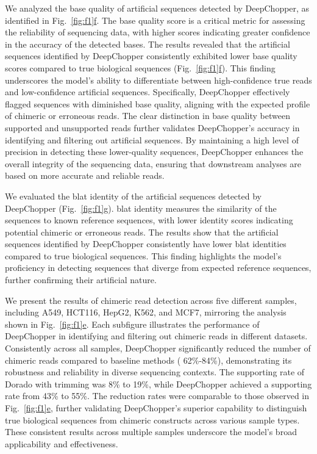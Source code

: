 \documentclass[pdflatex, sn-mathphys-num, lineno]{sn-jnl}%
\newcommand{\figref}[2]{Fig.~\hyperref[#1]{\ref*{#1}#2}}
\theoremstyle{thmstyleone}%
\theoremstyle{thmstyletwo}%
\theoremstyle{thmstylethree}%
\begin{document}
We analyzed the base quality of artificial sequences detected by DeepChopper, as identified in \figref{fig:f1}{f}.
The base quality score is a critical metric for assessing the reliability of sequencing data, with higher scores indicating greater confidence in the accuracy of the detected bases.
The results revealed that the artificial sequences identified by DeepChopper consistently exhibited lower base quality scores compared to true biological sequences (\figref{fig:f1}{f}).
This finding underscores the model's ability to differentiate between high-confidence true reads and low-confidence artificial sequences.
Specifically, DeepChopper effectively flagged sequences with diminished base quality, aligning with the expected profile of chimeric or erroneous reads.
The clear distinction in base quality between supported and unsupported reads further validates DeepChopper's accuracy in identifying and filtering out artificial sequences.
By maintaining a high level of precision in detecting these lower-quality sequences, DeepChopper enhances the overall integrity of the sequencing data, ensuring that downstream analyses are based on more accurate and reliable reads.

We evaluated the \gls{blat} identity of the artificial sequences detected by DeepChopper (\figref{fig:f1}{g}).
\gls{blat} identity measures the similarity of the sequences to known reference sequences, with lower identity scores indicating potential chimeric or erroneous reads.
The results show that the artificial sequences identified by DeepChopper consistently have lower \gls{blat} identities compared to true biological sequences.
This finding highlights the model's proficiency in detecting sequences that diverge from expected reference sequences, further confirming their artificial nature.

We present the results of chimeric read detection across five different samples, including A549, HCT116, HepG2, K562, and MCF7, mirroring the analysis shown in \figref{fig:f1}{e}.
Each subfigure  illustrates the performance of DeepChopper in identifying and filtering out chimeric reads in different datasets.
Consistently across all samples, DeepChopper significantly reduced the number of chimeric reads compared to baseline methods ( 62\%-84\%), demonstrating its robustness and reliability in diverse sequencing contexts.
The supporting rate of Dorado with trimming was 8\% to 19\%, while DeepChopper achieved a supporting rate from 43\% to 55\%.
The reduction rates were comparable to those observed in \figref{fig:f1}{e}, further validating DeepChopper’s superior capability to distinguish true biological sequences from chimeric constructs across various sample types.
These consistent results across multiple samples underscore the model's broad applicability and effectiveness.
\end{document}
